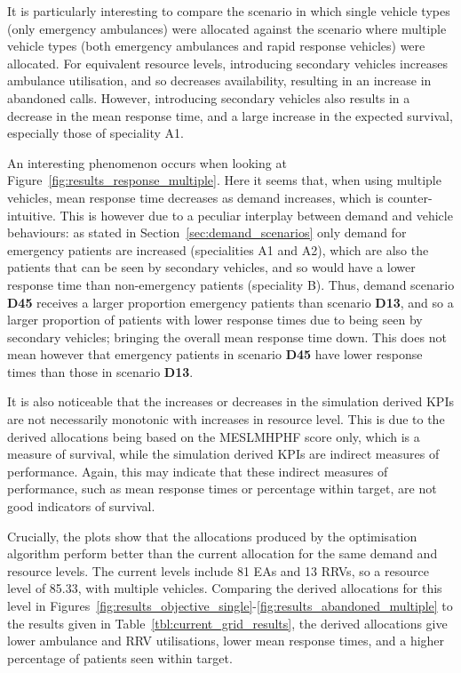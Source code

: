 \documentclass[preprint,12pt]{elsarticle}
\begin{document}
It is particularly interesting to compare the scenario in which single vehicle
types (only emergency ambulances) were allocated against the scenario where
multiple vehicle types (both emergency ambulances and rapid response vehicles)
were allocated. For equivalent resource levels, introducing secondary vehicles
increases ambulance utilisation, and so decreases availability, resulting in
an increase in abandoned calls. However, introducing secondary vehicles also
results in a decrease in the mean response time, and a large
increase in the expected survival, especially those of speciality A1.

An interesting phenomenon occurs when looking at
Figure~\ref{fig:results_response_multiple}. Here it seems that, when using
multiple vehicles, mean response time decreases as demand increases, which is
counter-intuitive. This is however due to a peculiar interplay between demand
and vehicle behaviours: as stated in
Section~\ref{sec:demand_scenarios} only demand for emergency patients are
increased (specialities A1 and A2), which are also the patients that can be seen
by secondary vehicles, and so would have a lower response time than
non-emergency patients (speciality B). Thus, demand scenario \textbf{D45}
receives a larger proportion emergency patients than scenario \textbf{D13}, and
so a larger proportion of patients with lower response times due to being seen
by secondary vehicles; bringing the overall mean response time down. This does
not mean however that emergency patients in scenario \textbf{D45} have lower
response times than those in scenario \textbf{D13}.

It is also noticeable that the increases or decreases in the simulation
derived KPIs are not necessarily monotonic with increases in resource level.
This is due to the derived allocations being based on the MESLMHPHF score
only, which is a measure of survival, while the simulation derived KPIs are
indirect measures of performance. Again, this may indicate that these indirect
measures of performance, such as mean response times or percentage within
target, are not good indicators of survival.

Crucially, the plots show that the allocations produced by the optimisation
algorithm perform better than the current allocation for the same demand and
resource levels. The current levels include 81 EAs and 13 RRVs, so a resource
level of 85.33, with multiple vehicles. Comparing the derived allocations for
this level in
Figures~\ref{fig:results_objective_single}-\ref{fig:results_abandoned_multiple}
to the results given in Table~\ref{tbl:current_grid_results}, the derived
allocations give lower ambulance and RRV utilisations, lower mean response
times, and a higher percentage of patients seen within target.
\end{document}
